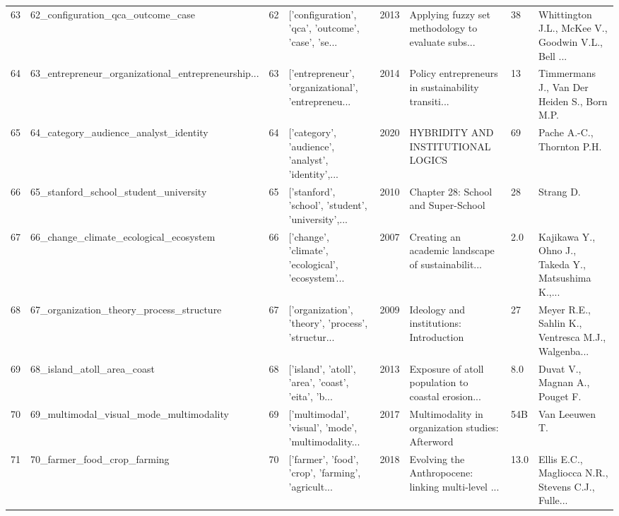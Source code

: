 \begin{tabular}{rlrlrlll}
         63 &                  62\_configuration\_qca\_outcome\_case &        62 & ['configuration', 'qca', 'outcome', 'case', 'se... &          2013 & Applying fuzzy set methodology to evaluate subs... &      38 & Whittington J.L., McKee V., Goodwin V.L., Bell ... \\
         64 & 63\_entrepreneur\_organizational\_entrepreneurship... &        63 & ['entrepreneur', 'organizational', 'entrepreneu... &          2014 & Policy entrepreneurs in sustainability transiti... &      13 &        Timmermans J., Van Der Heiden S., Born M.P. \\
         65 &              64\_category\_audience\_analyst\_identity &        64 & ['category', 'audience', 'analyst', 'identity',... &          2020 &                 HYBRIDITY AND INSTITUTIONAL LOGICS &      69 &                         Pache A.-C., Thornton P.H. \\
         66 &              65\_stanford\_school\_student\_university &        65 & ['stanford', 'school', 'student', 'university',... &          2010 &                Chapter 28: School and Super-School &      28 &                                          Strang D. \\
         67 &             66\_change\_climate\_ecological\_ecosystem &        66 & ['change', 'climate', 'ecological', 'ecosystem'... &          2007 & Creating an academic landscape of sustainabilit... &     2.0 & Kajikawa Y., Ohno J., Takeda Y., Matsushima K.,... \\
         68 &           67\_organization\_theory\_process\_structure &        67 & ['organization', 'theory', 'process', 'structur... &          2009 &            Ideology and institutions: Introduction &      27 & Meyer R.E., Sahlin K., Ventresca M.J., Walgenba... \\
         69 &                         68\_island\_atoll\_area\_coast &        68 & ['island', 'atoll', 'area', 'coast', 'eita', 'b... &          2013 & Exposure of atoll population to coastal erosion... &     8.0 &                     Duvat V., Magnan A., Pouget F. \\
         70 &            69\_multimodal\_visual\_mode\_multimodality &        69 & ['multimodal', 'visual', 'mode', 'multimodality... &          2017 &   Multimodality in organization studies: Afterword &     54B &                                     Van Leeuwen T. \\
         71 &                        70\_farmer\_food\_crop\_farming &        70 & ['farmer', 'food', 'crop', 'farming', 'agricult... &          2018 & Evolving the Anthropocene: linking multi-level ... &    13.0 & Ellis E.C., Magliocca N.R., Stevens C.J., Fulle... \\

\end{tabular}
